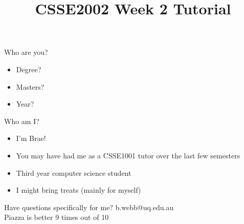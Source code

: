 \documentclass[week2]{csse2002}
\title{CSSE2002 Week 2 Tutorial}
\begin{document}
\begin{frame}
\maketitle
\end{frame}

\begin{topic}{Who are you?}
\begin{itemize}
\item Degree?
\item Masters?
\item Year?
\end{itemize}
\end{topic}

\begin{topic}{Who am I?}
\begin{itemize}
\item I'm Brae!
\item You may have had me as a CSSE1001 tutor over the last few semesters
\item Third year computer science student
\item I might bring treats (mainly for myself)
\end{itemize}
Have questions specifically for me? b.webb@uq.edu.au\\
Piazza is better 9 times out of 10
\end{topic}
\end{document}
